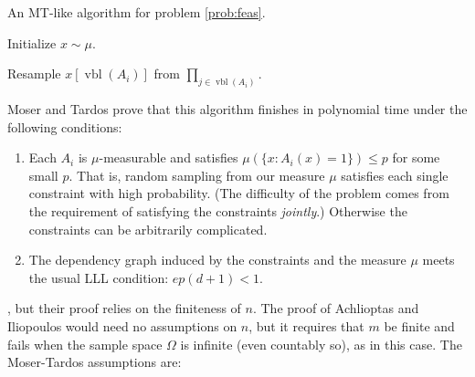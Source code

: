 \documentclass[twocolumn]{article}
\newcommand{\hasDist}%
  {\sim}
\begin{document}
\begin{algorithm}[H]
\caption{An MT-like algorithm for problem \ref{prob:feas}.}
\label{alg:mt-feas}
\begin{algorithmic}[1]

\State Initialize $x \hasDist \mu$.
\EndFor

    \Return
  \EndIf
  \State Resample $x[\operatorname{vbl}(A_i)]$ from $\prod_{j \in \operatorname{vbl}(A_i)}$.
  \EndFor
\EndFunction

\end{algorithmic}
\end{algorithm}

Moser and Tardos prove that this algorithm finishes in polynomial time under the following conditions:

\begin{enumerate}
  \item Each $A_i$ is $\mu$-measurable and satisfies $\mu(\{x: A_i(x) = 1\}) \leq p$ for some small $p$.  That is, random sampling from our measure $\mu$ satisfies each single constraint with high probability.  (The difficulty of the problem comes from the requirement of satisfying the constraints \emph{jointly}.)  Otherwise the constraints can be arbitrarily complicated.  \label{eqn:feas-margprob-condition}
  \item The dependency graph induced by the constraints and the measure $\mu$ meets the usual LLL condition: $e p (d+1) < 1$. \label{eqn:feas-lowdep-condition}
\end{enumerate}



, but their proof relies on the finiteness of $n$.  The proof of Achlioptas and Iliopoulos would need no assumptions on $n$, but it requires that $m$ be finite and fails when the sample space $\Omega$ is infinite (even countably so), as in this case.  The Moser-Tardos assumptions are:
\end{document}
